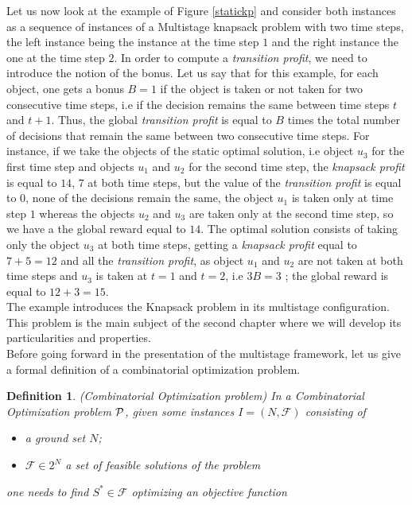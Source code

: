 \documentclass[a4paper]{book}
\newtheorem{definition}{Definition}
\begin{document}
Let us now look at the example of Figure \ref{statickp} and consider both instances as a sequence of instances of a {\sc Multistage knapsack} problem with two time steps, the left instance being the instance at the time step $1$ and the right instance the one at the time step $2$. In order to compute a \textit{transition profit}, we need to introduce the notion of the bonus. Let us say that for this example, for each object, one gets a bonus $B=1$ if the object is taken or not taken for two consecutive time steps, i.e if the decision remains the same between time steps $t$ and $t+1$. Thus, the global \textit{transition profit} is equal to $B$ times the total number of decisions that remain the same between two consecutive time steps. For instance, if we take the objects of the static optimal solution, i.e object $u_3$ for the first time step and objects $u_1$ and $u_2$ for the second time step, the \textit{knapsack profit} is equal to $14$, $7$ at both time steps, but the value of the \textit{transition profit} is equal to $0$, none of the decisions remain the same, the object $u_1$ is taken only at time step $1$ whereas the objects $u_2$ and $u_3$ are taken only at the second time step, so we have a the global reward equal to $14$. The optimal solution consists of taking only the object $u_3$ at both time steps, getting a \textit{knapsack profit} equal to $7+5=12$ and all the \textit{transition profit}, as object $u_1$ and $u_2$ are not taken at both time steps and $u_3$ is taken at $t=1$ and $t=2$, i.e $3B = 3$ ; the global
reward is equal to $12+3=15$.\\

The example introduces the {\sc Knapsack} problem in its multistage configuration. This problem is the main subject of the second chapter where we will develop its particularities and properties.\\

Before going forward in the presentation of the multistage framework, let us give a formal definition of a combinatorial optimization problem.

\begin{definition}{\emph{(Combinatorial Optimization problem)}} In a Combinatorial Optimization problem $\cal P$, given some instances $I = (N, \mathcal{F})$  consisting of
\begin{itemize}
    \item a ground set $N$;
    \item $\mathcal{F}\in 2^N$ a set of feasible solutions of the problem 
\end{itemize}
one needs to find $S^* \in \mathcal{F}$ optimizing an objective function
\end{definition}
\end{document}
